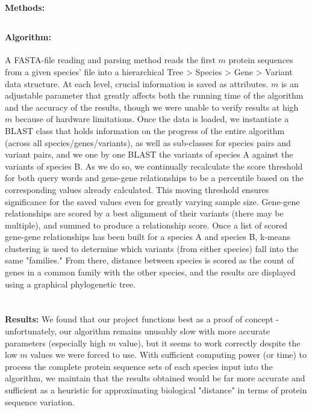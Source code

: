 \documentclass[11pt, oneside]{article}
\begin{document}
\pagebreak
\section{}
{\bfseries Methods:}

\subsection{}
\paragraph
{\bfseries Algorithm:} A FASTA-file reading and parsing method reads the first $m$ protein sequences from a given species' file into a hierarchical Tree > Species > Gene > Variant data structure. At each level, crucial information is saved as attributes. $m$ is an adjustable parameter that greatly affects both the running time of the algorithm and the accuracy of the results, though we were unable to verify results at high $m$ because of hardware limitations. Once the data is loaded, we instantiate a BLAST class that holds information on the progress of the entire algorithm (across all species/genes/variants), as well as sub-classes for species pairs and variant pairs, and we one by one BLAST the variants of species A against the variants of species B. As we do so, we continually recalculate the score threshold for both query words and gene-gene relationships to be a percentile based on the corresponding values already calculated. This moving threshold ensures significance for the saved values even for greatly varying sample size. Gene-gene relationships are scored by a best alignment of their variants (there may be multiple), and summed to produce a relationship score. Once a list of scored gene-gene relationships has been built for a species A and species B, k-means clustering is used to determine which variants (from either species) fall into the same "families." From there, distance between species is scored as the count of genes in a common family with the other species, and the results are displayed using a graphical phylogenetic tree. 

\pagebreak
\section{}
{\bfseries Results:} We found that our project functions best as a proof of concept - unfortunately, our algorithm remains unusably slow with more accurate parameters (especially high $m$ value), but it seems to work correctly despite the low $m$ values we were forced to use. With sufficient computing power (or time) to process the complete protein sequence sets of each species input into the algorithm, we maintain that the results obtained would be far more accurate and sufficient as a heuristic for approximating biological "distance" in terms of protein sequence variation.
\end{document}
